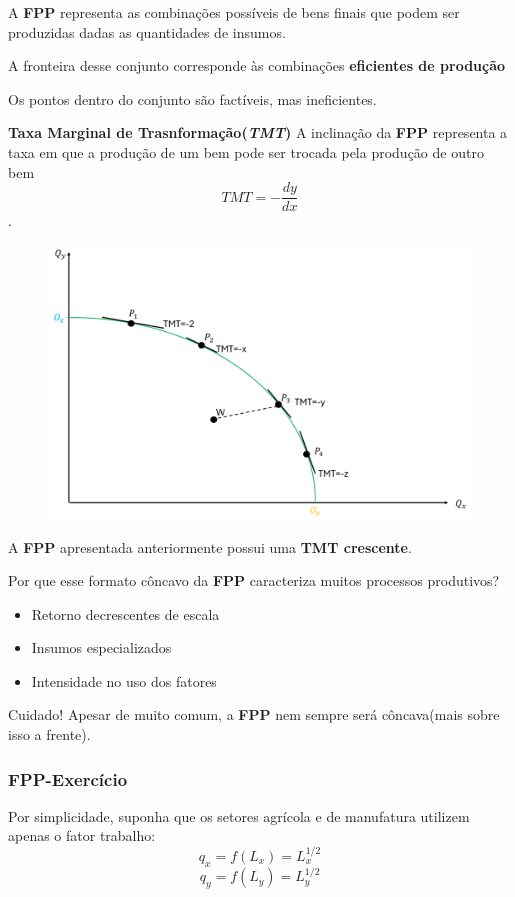 \documentclass[a4paper,12pt]{article}[abntex2]
\begin{document}
A \textbf{FPP} representa as combinações possíveis de bens finais que podem ser produzidas dadas as quantidades de insumos.

A fronteira desse conjunto corresponde às combinações \textbf{eficientes de produção}

Os pontos dentro do conjunto são factíveis, mas ineficientes.

\textbf{Taxa Marginal de Trasnformação(\textit{TMT})} A inclinação da \textbf{FPP} representa a taxa em que a produção de um bem pode ser trocada pela produção de outro bem \[TMT = -\frac{dy}{dx}\].

\begin{figure}[H]
    \centering
    \includegraphics[width=0.7\linewidth]{Imagens/a5i5.png}
\end{figure}

A \textbf{FPP} apresentada anteriormente possui uma \textbf{TMT crescente}.

Por que esse formato côncavo da \textbf{FPP} caracteriza muitos processos produtivos?\begin{itemize}
    \item Retorno decrescentes de escala 
    \item Insumos especializados 
    \item Intensidade no uso dos fatores 
\end{itemize}

Cuidado! Apesar de muito comum, a \textbf{FPP} nem sempre será côncava(mais sobre isso a frente).

\subsubsection{\textbf{FPP-Exercício}}
Por simplicidade, suponha que os setores agrícola e de manufatura utilizem apenas o fator trabalho: 
\[
q_x=f(L_x)=L_x^{1/2}
\]
\[
q_y=f(L_y)=L_y^{1/2}
\]
\end{document}
